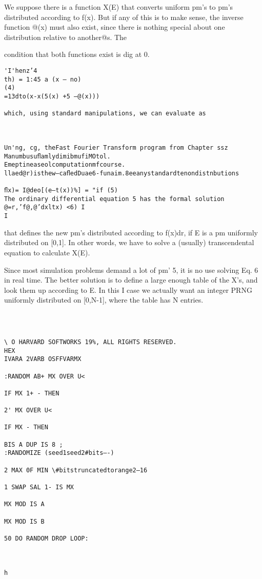 We suppose there is a function X(E) that converts uniform pm's
to pm’s distributed according to f(x). But if any of this is to make
sense, the inverse function @(x) must also exist, since there is
nothing special about one distribution relative to another@s. The

condition that both functions exist is dig at 0.

\begin{verbatim}
'I'henz’4
th) = 1:45 a (x — no)
(4)
=13dto(x-x(5(x) +5 —@(x)))

which, using standard manipulations, we can evaluate as

 

Un'ng, cg, theFast Fourier Transform program from Chapter ssz
ManumbusuﬂamlydimibmufiMOtol.
Emeptineaseolcomputationmfcourse.
llaed@r)isthew—caﬂedDuae6-funaim.8eeanystandardtenondistnbutions

ﬂx)= I@deo[(e—t(x))%] = "if (5)
The ordinary differential equation 5 has the formal solution
@=r,’f@,@’dxltx) <6) I
I
\end{verbatim}

that defines the new pm's distributed according to f(x)dr, if E is a
pm uniformly distributed on [0,1]. In other words, we have to
solve a (usually) transcendental equation to calculate X(E).

Since most simulation problems demand a lot of pm’ 5, it is no use
solving Eq. 6 in real time. The better solution is to define a large
enough table of the X’s, and look them up according to E. In this I
case we actually want an integer PRNG uniformly distributed on
[0,N-1], where the table has N entries.

 
\begin{verbatim}

 

\ O HARVARD SOFTWORKS 19%, ALL RIGHTS RESERVED.
HEX
IVARA 2VARB OSFFVARMX

:RANDOM AB+ MX OVER U<

IF MX 1+ - THEN

2' MX OVER U<

IF MX - THEN

BIS A DUP IS 8 ;
:RANDOMIZE (seed1seed2#bits—-)

2 MAX 0F MIN \#bitstruncatedtorange2—16

1 SWAP SAL 1- IS MX

MX MOD IS A

MX MOD IS B

50 DO RANDOM DROP LOOP:

 

h
\end{verbatim}



